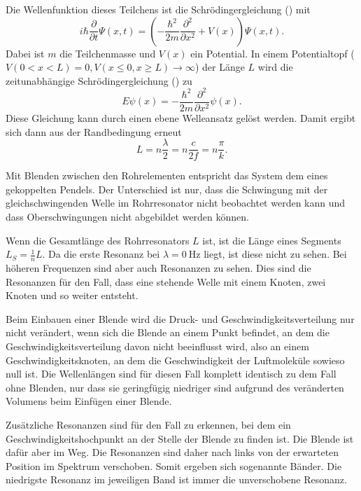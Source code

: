 Die Wellenfunktion dieses Teilchens ist die Schrödingergleichung (\cite{QM1}) mit 
\begin{equation*}
    i \hbar \frac{\partial}{\partial t} \Psi(x,t) = \left(- \frac{\hbar^2}{2m} \frac{\partial^2}{\partial x^2} + V(x)\right) \Psi(x,t).
\end{equation*}
Dabei ist $m$ die Teilchenmasse und $V(x)$ ein Potential. 
In einem Potentialtopf ($V(0 < x < L) = 0, V(x \leq 0, x \geq L) \to \infty$) der Länge $L$ wird die zeitunabhängige Schrödingergleichung (\cite{QM1}) zu 
\begin{equation*}
    E \psi(x) = - \frac{\hbar^2}{2m} \frac{\partial^2}{\partial x^2} \psi(x).
\end{equation*}
Diese Gleichung kann durch einen ebene Welleansatz gelöst werden. Damit ergibt sich dann aus der Randbedingung erneut
\begin{equation*}
    L = n \frac{\lambda}{2} = n \frac{c}{2f} = n \frac{\pi}{k}.
\end{equation*}

Mit Blenden zwischen den Rohrelementen entspricht das System dem eines gekoppelten Pendels.
Der Unterschied ist nur, dass die Schwingung mit der gleichschwingenden Welle im Rohrresonator nicht beobachtet werden kann und dass Oberschwingungen nicht abgebildet werden können. 


Wenn die Gesamtlänge des Rohrresonators $L$ ist, ist die Länge eines Segments $L_S = \frac{1}{n} L$. 
Da die erste Resonanz bei $\lambda = \SI{0}{\hertz}$ liegt, ist diese nicht zu sehen. Bei höheren Frequenzen sind aber auch Resonanzen zu sehen. Dies sind die Resonanzen für den Fall, dass eine stehende Welle mit einem Knoten, zwei Knoten und so weiter entsteht.

Beim Einbauen einer Blende wird die Druck- und Geschwindigkeitsverteilung nur nicht verändert, wenn sich die Blende an einem Punkt befindet, an dem die Geschwindigkeitsverteilung davon nicht beeinflusst wird, also an einem Geschwindigkeitsknoten, an dem die Geschwindigkeit der Luftmoleküle sowieso null ist.
Die Wellenlängen sind für diesen Fall komplett identisch zu dem Fall ohne Blenden, nur dass sie geringfügig niedriger sind aufgrund des veränderten Volumens beim Einfügen einer Blende.

Zusätzliche Resonanzen sind für den Fall zu erkennen, bei dem ein Geschwindigkeitshochpunkt an der Stelle der Blende zu finden ist.
Die Blende ist dafür aber im Weg. Die Resonanzen sind daher nach links von der erwarteten Position im Spektrum verschoben. Somit ergeben sich sogenannte Bänder. Die niedrigste Resonanz im jeweiligen Band ist immer die unverschobene Resonanz.

